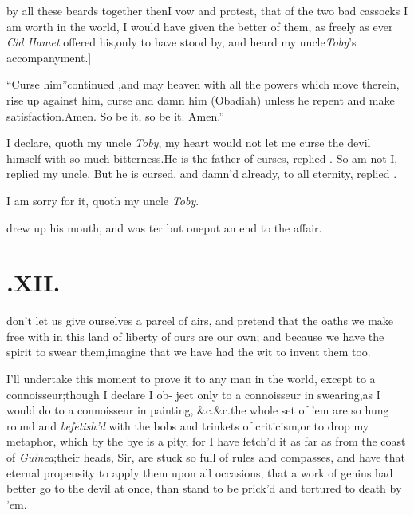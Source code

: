 \documentclass{article}
\begin{document}
\noindent
by all these beards together
then\tsh I vow and protest, that of the two bad cassocks I
am worth in the world, I would have given the better of them, as
freely as ever \textit{Cid Hamet} offered his,\tsh only to have
stood by, and heard my uncle\break \textit{Toby}’s accompanyment.]

\tsh “Curse him”\tsh continued\break
\drslop,\tsh\lqq and may heaven with\break
\lqq all the powers which move therein,\break
\lqq rise up against him, curse and damn\break
\lqq him (Obadiah) unless he repent and\break
\lqq make satisfaction.\quad Amen. So be it,\break
\lqq \tsk so be it. Amen.”

I declare, quoth my uncle \textit{Toby}, my heart would not let me
curse the devil himself with so much bitterness.\tsk He is the
father of curses, replied \drslop.\break
\tsh So am not I, replied my uncle.\tsh{}
But he is cursed, and damn’d already, to all eternity, replied \drslop.

I am sorry for it, quoth my uncle \textit{Toby}.

\drslop drew up his mouth, and was 
ter but one\tsh put an end to the affair.

\section{.\quad  XII.}

 don’t let us give ourselves a\break
parcel of airs, and pretend that the oaths we make free with in
this land of liberty of ours are our own; and because we have the
spirit to swear them,\break\tsh imagine that we have had the wit
to invent them too.

I’ll undertake this moment to prove it 
to any man in the world, except to a\break
connoisseur;\tsh though I declare I ob-\break
ject only to a connoisseur in swearing,\tsh as I would
do to a connoisseur in painting, \&c.\@ \&c.\@ the whole set of
’em are so hung round and \textit{befetish’d} with the
bobs and trinkets of criticism,\tsh or to drop my
metaphor, which by the bye is a pity,\break
\tsh for I have
fetch’d it as far as from the coast of
\textit{Guinea};\tsk their heads, Sir, are stuck so full of rules and compasses, and
have that eternal propensity to apply them upon all occasions, that
a work of genius had better go to the devil at once, than stand to
be prick’d and tortured to death by ’em.
\end{document}
